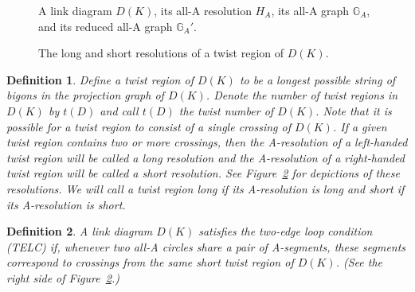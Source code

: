 \documentclass{article}
\newtheorem{definition}{Definition}[section]
\newtheorem{remark}{Remark}[section]
\begin{document}
\begin{figure}
	\centering
		\def\svgwidth{3.5in}
		
	\caption{A link diagram $D(K)$, its all-A resolution $H_{A}$, its all-A graph $\mathbb{G}_{A}$, and its reduced all-A graph $\mathbb{G}_{A}'$.}
	\label{figure8}
\end{figure}


\begin{figure}
	\centering
		\def\svgwidth{200pt}
		
	\caption{The long and short resolutions of a twist region of $D(K)$.}
	\label{longshort}
\end{figure}

\begin{definition} 
Define a \emph{twist region} of $D(K)$ to be a longest possible string of bigons in the projection graph of $D(K)$. Denote the number of twist regions in $D(K)$ by $t(D)$ and call $t(D)$ the \emph{twist number} of $D(K)$. Note that it is possible for a twist region to consist of a single crossing of $D(K)$. If a given twist region contains two or more crossings, then the A-resolution of a left-handed twist region will be called a \emph{long resolution} and the A-resolution of a right-handed twist region will be called a \emph{short resolution}. See Figure~\ref{longshort} for depictions of these resolutions. We will call a twist region \emph{long} if its A-resolution is long and \emph{short} if its A-resolution is short. 
\end{definition}

\begin{definition}
A link diagram $D(K)$ satisfies the \emph{two-edge loop condition (TELC)} if, whenever two all-A circles share a pair of A-segments, these segments correspond to crossings from the same short twist region of $D(K)$. (See the right side of Figure~\ref{longshort}.)
\end{definition}
\end{document}

